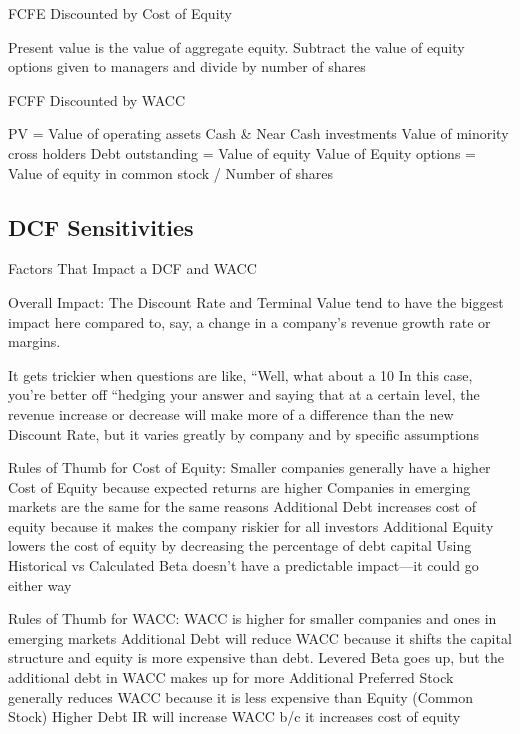 \documentclass[10pt]{article}
\begin{document}
    \begin{core}{FCFE Discounted by Cost of Equity}

      Present value is the value of aggregate equity. Subtract the value of equity options given to managers and divide by number of shares

    \end{core}

    \begin{core}{FCFF Discounted by WACC}

      PV = Value of operating assets
      Cash & Near Cash investments
      Value of minority cross holders
      Debt outstanding
      = Value of equity
      Value of Equity options
      = Value of equity in common stock
      / Number of shares

    \end{core}

  \subsection{DCF Sensitivities}

    \begin{core}{Factors That Impact a DCF and WACC}

      Overall Impact: The Discount Rate and Terminal Value tend to have the biggest impact here compared to, say, a change in a company’s revenue growth rate or margins.

      It gets trickier when questions are like, “Well, what about a 10%
      In this case, you’re better off “hedging your answer and saying that at a certain level, the revenue increase or decrease will make more of a difference than the new Discount Rate, but it varies greatly by company and by specific assumptions

      Rules of Thumb for Cost of Equity:
      Smaller companies generally have a higher Cost of Equity because expected returns are higher
      Companies in emerging markets are the same for the same reasons
      Additional Debt increases cost of equity because it makes the company riskier for all investors
      Additional Equity lowers the cost of equity by decreasing the percentage of debt capital
      Using Historical vs Calculated Beta doesn’t have a predictable impact—it could go either way

      Rules of Thumb for WACC:
      WACC is higher for smaller companies and ones in emerging markets
      Additional Debt will reduce WACC because it shifts the capital structure and equity is more expensive than debt. Levered Beta goes up, but the additional debt in WACC makes up for more
      Additional Preferred Stock generally reduces WACC because it is less expensive than Equity (Common Stock)
      Higher Debt IR will increase WACC b/c it increases cost of equity
      
    \end{core}
\end{document}
